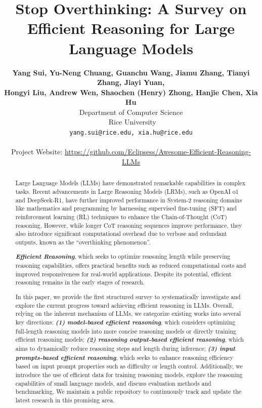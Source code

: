 \documentclass{article}
\title{Stop Overthinking: A Survey on \\ Efficient Reasoning for Large Language Models}
\author{%
\textbf{Yang Sui,}$^{}$ \enspace
\textbf{Yu-Neng Chuang,}$^{}$ \enspace
\textbf{Guanchu Wang,}$^{}$ \enspace
\textbf{Jiamu Zhang,}$^{}$  \enspace
\textbf{Tianyi Zhang,}$^{}$ \enspace
\textbf{Jiayi Yuan,}$^{}$ \\
\textbf{Hongyi Liu,}$^{}$ \enspace
\textbf{Andrew Wen,}$^{}$ \enspace
\textbf{Shaochen (Henry) Zhong,}$^{}$ \enspace
\textbf{Hanjie Chen,}$^{}$ \enspace
\textbf{Xia Hu}$^{}$ \enspace \\ 
Department of Computer Science \\
$^{}$ Rice University \\
\texttt{yang.sui@rice.edu, xia.hu@rice.edu}
\\
\\
Project Website: {\href{https://github.com/Eclipsess/Awesome-Efficient-Reasoning-LLMs}{https://github.com/Eclipsess/Awesome-Efficient-Reasoning-LLMs}}
}
\newcommand{\TODOYS}[1]{\textcolor{red}{\textbf{TODO (YS): #1}}}
\begin{document}
\maketitle
\renewcommand{\thefootnote}{\fnsymbol{footnote}}
\renewcommand*{\thefootnote}{\arabic{footnote}}






\begin{abstract}
    Large Language Models (LLMs) have demonstrated remarkable capabilities in complex tasks. Recent advancements in Large Reasoning Models (LRMs), such as OpenAI o1 and DeepSeek-R1, have further improved performance in System-2 reasoning domains like mathematics and programming by harnessing supervised fine-tuning (SFT) and reinforcement learning (RL) techniques to enhance the Chain-of-Thought (CoT) reasoning. 
    However, while longer CoT reasoning sequences improve performance, they also introduce significant computational overhead due to verbose and redundant outputs, known as the ``overthinking phenomenon''.

    \textbf{\textit{Efficient Reasoning}}, which seeks to optimize reasoning length while preserving reasoning capabilities, offers practical benefits such as reduced computational costs and improved responsiveness for real-world applications. 
    Despite its potential, efficient reasoning remains in the early stages of research. 
    
    In this paper, we provide the first structured survey to systematically investigate and explore the current progress toward achieving efficient reasoning in LLMs. 
    Overall, relying on the inherent mechanism of LLMs, we categorize existing works into several key directions: \textbf{\textit{(1) model-based efficient reasoning}}, which considers optimizing full-length reasoning models into more concise reasoning models or directly training efficient reasoning models; \textbf{\textit{(2) reasoning output-based efficient reasoning}}, which aims to dynamically reduce reasoning steps and length during inference; \textbf{\textit{(3) input prompts-based efficient reasoning}}, which seeks to enhance reasoning efficiency based on input prompt properties such as difficulty or length control. 
    Additionally, we introduce the use of efficient data for training reasoning models, explore the reasoning capabilities of small language models, and discuss evaluation methods and benchmarking.
    We maintain a public repository to continuously track and update the latest research in this promising area.

\end{abstract}
\end{document}
